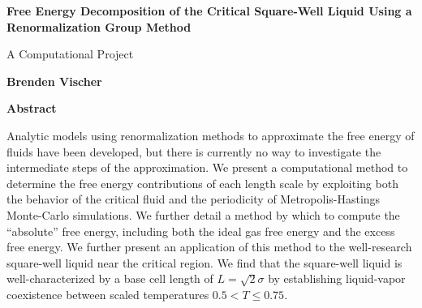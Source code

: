 \thispagestyle{plain}
\begin{center}
    \Large
    \textbf{Free Energy Decomposition of the Critical Square-Well Liquid Using a Renormalization Group Method}
   
    \vspace{0.8cm}
    \large
    A Computational Project
    
    \vspace{0.8cm}
    \textbf{Brenden Vischer}
    
    \vspace{1.2cm}
    \textbf{Abstract}
\end{center}
Analytic models using renormalization methods to approximate the free energy of fluids have been developed, but there is currently no way to investigate the intermediate steps of the approximation. We present a computational method to determine the free energy contributions of each length scale by exploiting both the behavior of the critical fluid and the periodicity of Metropolis-Hastings Monte-Carlo simulations. We further detail a method by which to compute the “absolute” free energy, including both the ideal gas free energy and the excess free energy. We further present an application of this method to the well-research square-well liquid near the critical region. We find that the square-well liquid is well-characterized by a base cell length of $L=\sqrt2 \sigma$ by establishing liquid-vapor coexistence between scaled temperatures $0.5<T\leq0.75$.
\clearpage